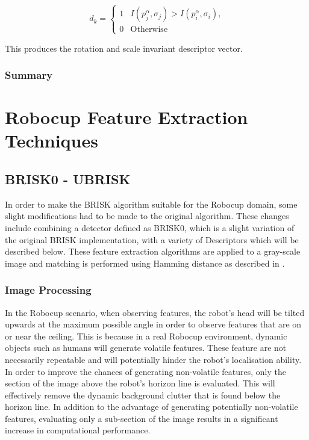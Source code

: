 \documentclass{report}
\begin{document}
\begin{equation}
d_k = \left\{ \begin{array}{rl}
1 &\mbox{$I(p_j^{\alpha}, \sigma_j) > I(p_i^{\alpha}, \sigma_i)$,} \\
0 &\mbox{Otherwise}
\end{array} \right.
\label{eqn:brightness}
\end{equation}

This produces the rotation and scale invariant descriptor vector.\\

\subsection{Summary}
\label{sec:summary1} 

\chapter{Robocup Feature Extraction Techniques}
\label{sec:realtimeFeatureExtraction}

\section{BRISK0 - UBRISK}
\label{sec:brisk0}
In order to make the BRISK algorithm suitable for the Robocup domain, some slight modifications had to be made to the original algorithm. These changes include combining a detector defined as BRISK0, which is a slight variation of the original BRISK implementation, with a variety of Descriptors which will be described below. These feature extraction algorithms are applied to a gray-scale image and matching is performed using Hamming distance as described in .\\

\subsection{Image Processing}
\label{sec:imageProcessingBrisk}
In the Robocup scenario, when observing features, the robot's head will be tilted upwards at the maximum possible angle in order to observe features that are on or near the ceiling. This is because in a real Robocup environment, dynamic objects such as humans will generate volatile features. These feature are not necessarily repeatable and will potentially hinder the robot's localisation ability.\\

In order to improve the chances of generating non-volatile features, only the section of the image above the robot's horizon line is evaluated. This will effectively remove the dynamic background clutter that is found below the horizon line. In addition to the advantage of generating potentially non-volatile features, evaluating only a sub-section of the image results in a significant increase in computational performance. \\ 
\end{document}
